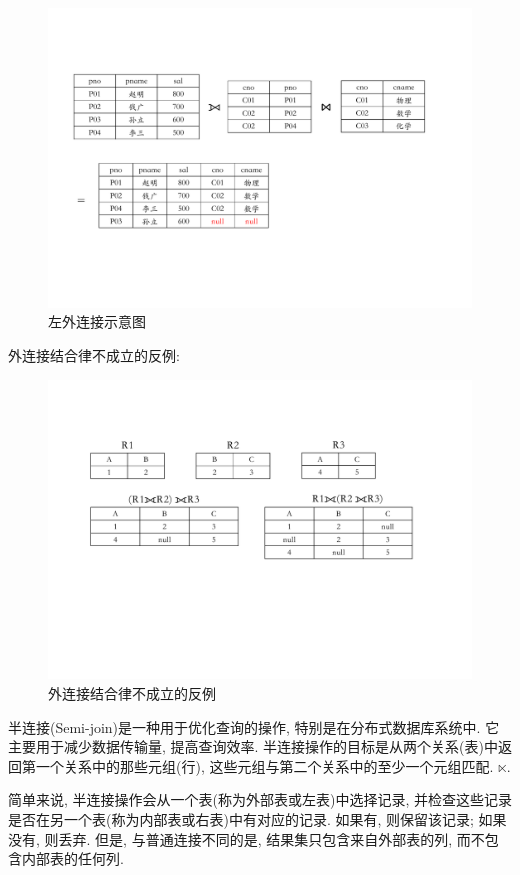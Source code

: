 \begin{figure}[H]
    \centering
    \includegraphics[width=.85\textwidth]{./figure/左外连接.pdf}
    \caption{左外连接示意图}
\end{figure}

外连接结合律不成立的反例:
\begin{figure}[H]
    \centering
    \includegraphics[width=.8\textwidth]{./figure/外连接结合律不成立.pdf}
    \caption{外连接结合律不成立的反例}
\end{figure}

\begin{definition}[半连接]
半连接(Semi-join)是一种用于优化查询的操作, 特别是在分布式数据库系统中. 
它主要用于减少数据传输量, 提高查询效率. 
半连接操作的目标是从两个关系(表)中返回第一个关系中的那些元组(行), 
这些元组与第二个关系中的至少一个元组匹配. $\ltimes$.

简单来说, 半连接操作会从一个表(称为外部表或左表)中选择记录, 
并检查这些记录是否在另一个表(称为内部表或右表)中有对应的记录.
如果有, 则保留该记录; 如果没有, 则丢弃. 
但是, 与普通连接不同的是, 结果集只包含来自外部表的列, 而不包含内部表的任何列.
\end{definition}

